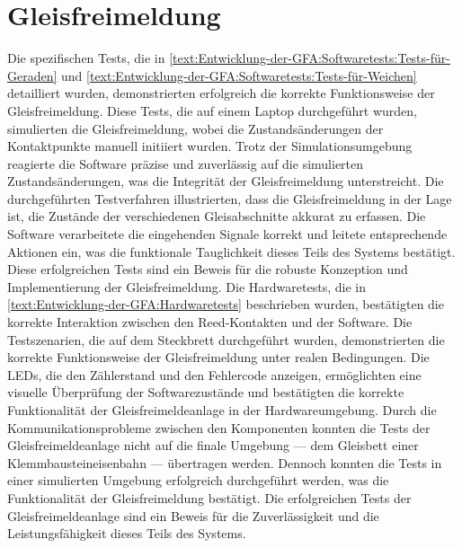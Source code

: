 \section{Gleisfreimeldung}\label{text:Auswertung:Gleisfreimeldung}

Die spezifischen Tests, die in \autoref{text:Entwicklung-der-GFA:Softwaretests:Tests-für-Geraden}  und \autoref{text:Entwicklung-der-GFA:Softwaretests:Tests-für-Weichen}  detailliert wurden, demonstrierten erfolgreich die korrekte Funktionsweise der Gleisfreimeldung. Diese Tests, die auf einem Laptop durchgeführt wurden, simulierten die Gleisfreimeldung, wobei die Zustandsänderungen der Kontaktpunkte manuell initiiert wurden. Trotz der Simulationsumgebung reagierte die Software präzise und zuverlässig auf die simulierten Zustandsänderungen, was die Integrität der Gleisfreimeldung unterstreicht.
\newline
Die durchgeführten Testverfahren illustrierten, dass die Gleisfreimeldung in der Lage ist, die Zustände der verschiedenen Gleisabschnitte akkurat zu erfassen. Die Software verarbeitete die eingehenden Signale korrekt und leitete entsprechende Aktionen ein, was die funktionale Tauglichkeit dieses Teils des Systems bestätigt. Diese erfolgreichen Tests sind ein Beweis für die robuste Konzeption und Implementierung der Gleisfreimeldung.
\newline
Die Hardwaretests, die in \autoref{text:Entwicklung-der-GFA:Hardwaretests}  beschrieben wurden, bestätigten die korrekte Interaktion zwischen den Reed-Kontakten und der Software. Die Testszenarien, die auf dem Steckbrett durchgeführt wurden, demonstrierten die korrekte Funktionsweise der Gleisfreimeldung unter realen Bedingungen. Die LEDs, die den Zählerstand und den Fehlercode anzeigen, ermöglichten eine visuelle Überprüfung der Softwarezustände und bestätigten die korrekte Funktionalität der Gleisfreimeldeanlage in der Hardwareumgebung.
\newline
Durch die Kommunikationsprobleme zwischen den Komponenten konnten die Tests der Gleisfreimeldeanlage nicht auf die finale Umgebung --- dem Gleisbett einer Klemmbausteineisenbahn --- übertragen werden. Dennoch konnten die Tests in einer simulierten Umgebung erfolgreich durchgeführt werden, was die Funktionalität der Gleisfreimeldung bestätigt. Die erfolgreichen Tests der Gleisfreimeldeanlage sind ein Beweis für die Zuverlässigkeit und die Leistungsfähigkeit dieses Teils des Systems.
